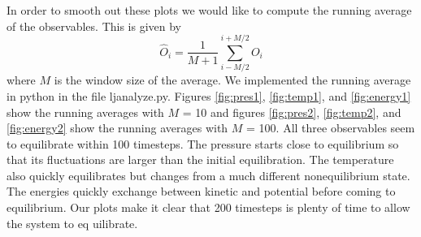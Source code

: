 In order to smooth out these plots we would like to compute the running average of the observables. This is given by
\begin{equation}
\hat{O}_i = \frac{1}{M+1} \sum_{i - M/2}^{i+M/2} O_i
\end{equation}
where $M$ is the window size of the average. We implemented the running average in python in the file ljanalyze.py.
Figures \ref{fig:pres1}, \ref{fig:temp1}, and \ref{fig:energy1} show the running averages with $M$ = 10 and figures \ref{fig:pres2}, \ref{fig:temp2}, and \ref{fig:energy2} show the running averages with $M$ = 100. All three observables seem to equilibrate within 100 timesteps. The pressure starts close to equilibrium so that its fluctuations are larger than the initial equilibration. The temperature also quickly equilibrates but changes from a much different nonequilibrium state. The energies quickly exchange between kinetic and potential before coming to equilibrium. Our plots make it clear that 200 timesteps is plenty of time to allow the system to eq	uilibrate.
